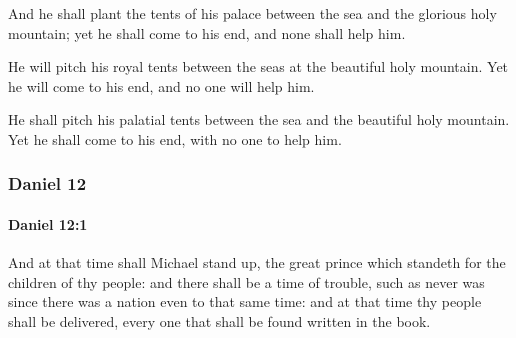 			\begin{versebox}
					\item[BHS] 
					\item[LXX] 
					\item[ASV] And he shall plant the tents of his palace between the sea and the glorious holy mountain; yet he shall come to his end, and none shall help him.
					\item[NIV] He will pitch his royal tents between the seas at the beautiful holy mountain. Yet he will come to his end, and no one will help him.
					\item[NRSV] He shall pitch his palatial tents between the sea and the beautiful holy mountain. Yet he shall come to his end, with no one to help him.
			\end{versebox}
	\subsubsection{Daniel 12} %
		\label{DANIEL-12}

		\paragraph{Daniel 12:1} %
			\label{DANIEL-12-1}

			And at that time shall Michael stand up, the great prince which standeth for the children of thy people: and there shall be a time of trouble, such as never was since there was a nation even to that same time: and at that time thy people shall be delivered, every one that shall be found written in the book.


